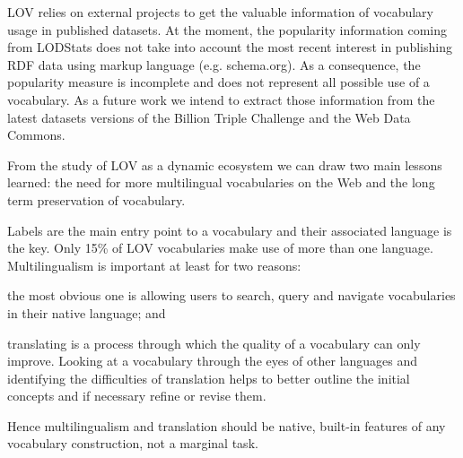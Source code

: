 \documentclass{iosart2c}
\begin{document}
LOV relies on external projects to get the valuable information of vocabulary usage in published datasets. At the moment, the popularity information coming from LODStats does not take into account the most recent interest in publishing RDF data using markup language (e.g. schema.org). As a consequence, the popularity measure is incomplete and does not represent all possible use of a vocabulary. As a future work we intend to extract those information from the latest datasets versions of the Billion Triple Challenge and the Web Data Commons.



From the study of LOV as a dynamic ecosystem we can draw two main lessons learned: the need for more multilingual vocabularies on the Web and the long term preservation of vocabulary. 

Labels are the main entry point to a vocabulary and their associated language is the key. Only 15\% of LOV vocabularies make use of more than one language. Multilingualism is important at least for two reasons: 
\begin{inparaenum}[1)] 
	\item the most obvious one is allowing users to search, query and navigate vocabularies in their native language; and
	\item translating is a process through which the quality of a vocabulary can only improve. Looking at a vocabulary through the eyes of other languages and identifying the difficulties of translation helps to better outline the initial concepts and if necessary refine or revise them. 
\end{inparaenum} 
Hence multilingualism and translation should be native, built-in features of any vocabulary construction, not a marginal task.
\end{document}
